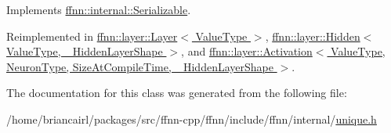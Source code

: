 Implements \hyperlink{classffnn_1_1internal_1_1_serializable_a98b43aa17c4986e8a1b809b9d64796bb}{ffnn\-::internal\-::\-Serializable}.



Reimplemented in \hyperlink{classffnn_1_1layer_1_1_layer_ac265fc929a178b111337226dd1cb62b6}{ffnn\-::layer\-::\-Layer$<$ Value\-Type $>$}, \hyperlink{classffnn_1_1layer_1_1_hidden_a1ef2b7dc49a809498125190628e672cf}{ffnn\-::layer\-::\-Hidden$<$ Value\-Type, \-\_\-\-Hidden\-Layer\-Shape $>$}, and \hyperlink{classffnn_1_1layer_1_1_activation_af4fa0c4e44033921fe6ada1dcd0c0560}{ffnn\-::layer\-::\-Activation$<$ Value\-Type, Neuron\-Type, Size\-At\-Compile\-Time, \-\_\-\-Hidden\-Layer\-Shape $>$}.



The documentation for this class was generated from the following file\-:\begin{DoxyCompactItemize}
\item 
/home/briancairl/packages/src/ffnn-\/cpp/ffnn/include/ffnn/internal/\hyperlink{unique_8h}{unique.\-h}\end{DoxyCompactItemize}
